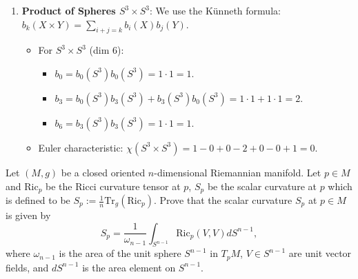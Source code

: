 \begin{remark}
\begin{enumerate}
    \item \textbf{Product of Spheres $S^3 \times S^3$}:
    We use the Künneth formula: $b_k(X \times Y) = \sum_{i+j=k} b_i(X)b_j(Y)$.
    \begin{itemize}
        \item For $S^3 \times S^3$ (dim 6):
        \begin{itemize}
            \item $b_0 = b_0(S^3)b_0(S^3) = 1 \cdot 1 = 1$.
            \item $b_3 = b_0(S^3)b_3(S^3) + b_3(S^3)b_0(S^3) = 1 \cdot 1 + 1 \cdot 1 = 2$.
            \item $b_6 = b_3(S^3)b_3(S^3) = 1 \cdot 1 = 1$.
        \end{itemize}
        \item Euler characteristic: $\chi(S^3 \times S^3) = 1 - 0 + 0 - 2 + 0 - 0 + 1 = 0$.
    \end{itemize}
\end{enumerate}
\end{remark}

\begin{exercise}
\label{geometry:2024:4}
Let $(M, g)$ be a closed oriented $n$-dimensional Riemannian manifold. Let $p \in M$ and $\mathrm{Ric}_p$ be the Ricci curvature tensor at $p$, $S_p$ be the scalar curvature at $p$ which is defined to be $S_p := \frac{1}{n} \mathrm{Tr}_g(\mathrm{Ric}_p)$. Prove that the scalar curvature $S_p$ at $p \in M$ is given by
\[
S_p = \frac{1}{\omega_{n-1}} \int_{S^{n-1}} \mathrm{Ric}_p(V, V) d S^{n-1},
\]
where $\omega_{n-1}$ is the area of the unit sphere $S^{n-1}$ in $T_p M$, $V \in S^{n-1}$ are unit vector fields, and $d S^{n-1}$ is the area element on $S^{n-1}$.
\end{exercise}

